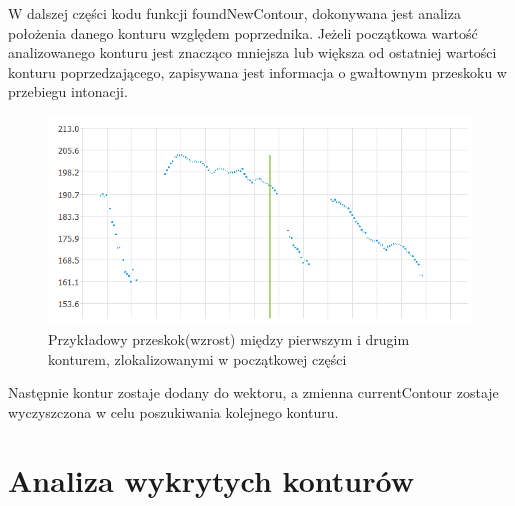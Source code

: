 \documentclass[a4paper,12 pt]{article}
\begin{document}
W dalszej części kodu funkcji foundNewContour, dokonywana jest analiza położenia danego konturu względem poprzednika. Jeżeli początkowa wartość analizowanego konturu jest znacząco mniejsza lub większa od ostatniej wartości konturu poprzedzającego, zapisywana jest informacja o gwałtownym przeskoku w przebiegu intonacji.
 \FloatBarrier
\begin{figure}[h]
\centering
\includegraphics[scale=0.7]{przeskok.png}
\caption{Przykładowy przeskok(wzrost) między pierwszym i drugim konturem, zlokalizowanymi w początkowej części}
\end{figure}
\FloatBarrier
Następnie kontur zostaje dodany do wektoru, a zmienna currentContour zostaje wyczyszczona w celu poszukiwania kolejnego konturu.
\section{Analiza wykrytych konturów}
\end{document}
